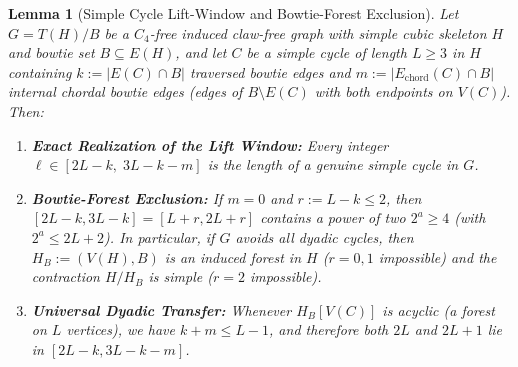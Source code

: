 \documentclass[11pt,reqno]{amsart}
\theoremstyle{plain}
\newtheorem{lemma}[theorem]{Lemma}
\theoremstyle{definition}
\theoremstyle{remark}
\DeclareRobustCommand{\_}{\ifmmode\text{\textunderscore}\else\textunderscore\allowbreak\fi}
\begin{document}
\begin{lemma}[Simple Cycle Lift-Window and Bowtie-Forest Exclusion]\label{lem:lift-window}
Let $G = T(H)/B$ be a $C_4$-free induced claw-free graph with simple cubic skeleton $H$ and bowtie set $B \subseteq E(H)$, and let $C$ be a simple cycle of length $L \ge 3$ in $H$ containing $k := |E(C) \cap B|$ traversed bowtie edges and $m := |E_{\mathrm{chord}}(C) \cap B|$ internal chordal bowtie edges (edges of $B \setminus E(C)$ with both endpoints on $V(C)$). Then:
\begin{enumerate}[label=(\roman*),leftmargin=2.2em]
  \item \textbf{Exact Realization of the Lift Window:} Every integer $\ell \in [2L - k,\; 3L - k - m]$ is the length of a genuine simple cycle in $G$.
  \item \textbf{Bowtie-Forest Exclusion:} If $m = 0$ and $r := L - k \le 2$, then $[2L - k, 3L - k] = [L + r, 2L + r]$ contains a power of two $2^a \ge 4$ (with $2^a \le 2L + 2$). In particular, if $G$ avoids all dyadic cycles, then $H_B := (V(H), B)$ is an \emph{induced forest} in $H$ ($r = 0, 1$ impossible) and the contraction $H / H_B$ is \emph{simple} ($r = 2$ impossible).
  \item \textbf{Universal Dyadic Transfer:} Whenever $H_B[V(C)]$ is acyclic (a forest on $L$ vertices), we have $k + m \le L - 1$, and therefore both $2L$ and $2L + 1$ lie in $[2L - k, 3L - k - m]$.
\end{enumerate}
\end{lemma}
\end{document}

